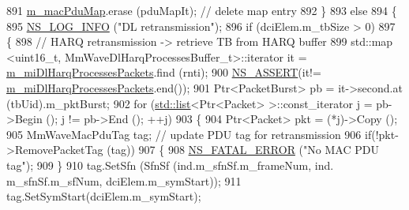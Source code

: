 \begin{DoxyCode}
891                                         \hyperlink{classns3_1_1MmWaveEnbMac_a72ab38c642f56564a655e65744e7df1a}{m\_macPduMap}.erase (pduMapIt);  \textcolor{comment}{// delete map entry}
892                                 \}
893                                 \textcolor{keywordflow}{else}
894                                 \{
895                                         \hyperlink{group__logging_gafbd73ee2cf9f26b319f49086d8e860fb}{NS\_LOG\_INFO} (\textcolor{stringliteral}{"DL retransmission"});
896                                         \textcolor{keywordflow}{if} (dciElem.m\_tbSize > 0)
897                                         \{                                               
898                                                 \textcolor{comment}{// HARQ retransmission -> retrieve TB from HARQ buffer}
899                                                 std::map <uint16\_t,
       MmWaveDlHarqProcessesBuffer\_t>::iterator it = \hyperlink{classns3_1_1MmWaveEnbMac_aa2508718e6021eb3e796e5aeab6dc219}{m\_miDlHarqProcessesPackets}.find (rnti);
900                                                 \hyperlink{assert_8h_a6dccdb0de9b252f60088ce281c49d052}{NS\_ASSERT}(it!=
      \hyperlink{classns3_1_1MmWaveEnbMac_aa2508718e6021eb3e796e5aeab6dc219}{m\_miDlHarqProcessesPackets}.end());
901                                                 Ptr<PacketBurst> pb = it->second.at (tbUid).m\_pktBurst;
902                                                 \textcolor{keywordflow}{for} (\hyperlink{openflow-interface_8h_afd9bcfa176617760671b67580f536fa7}{std::list}<Ptr<Packet> >::const\_iterator j = 
      pb->Begin (); j != pb->End (); ++j)
903                                                 \{
904                                                         Ptr<Packet> pkt = (*j)->Copy ();
905                                                         MmWaveMacPduTag tag;                                            \textcolor{comment}{
      // update PDU tag for retransmission}
906                                                         \textcolor{keywordflow}{if}(!pkt->RemovePacketTag (tag))
907                                                         \{
908                                                                 \hyperlink{group__fatal_ga5131d5e3f75d7d4cbfd706ac456fdc85}{NS\_FATAL\_ERROR} (\textcolor{stringliteral}{"No MAC PDU
       tag"});
909                                                         \}
910                                                         tag.SetSfn (SfnSf (ind.m\_sfnSf.m\_frameNum, ind.
      m\_sfnSf.m\_sfNum, dciElem.m\_symStart));
911                                                         tag.SetSymStart(dciElem.m\_symStart);

\end{DoxyCode}
